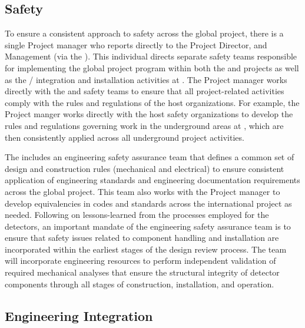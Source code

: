 \subsection{Safety}
\label{sec:dune_safety}

To ensure a consistent approach to safety across the global project,
there is a single Project  manager who reports directly to
the  Project Director,  and 
Management (via the  ).  This individual
directs separate safety teams responsible for implementing the global
project  program within both the  and
 projects as well as the /
integration and installation activities at .  The Project
 manager works directly with the \fnal and  safety
teams to ensure that all project-related activities comply with the
rules and regulations of the host organizations.  For example, the
Project  manger works directly with the host safety
organizations to develop the rules and regulations governing work in
the underground areas at , which are then consistently applied
across all underground project activities.

The  includes an engineering safety assurance team that
defines a common set of design and construction rules (mechanical and
electrical) to ensure consistent application of engineering standards
and engineering documentation requirements across the global project.
This team also works with the Project  manager to develop
equivalencies in codes and standards across the international project
as needed.  Following on lessons-learned from the processes employed
for the  detectors, an important mandate of the
engineering safety assurance team is to ensure that safety issues
related to component handling and installation are incorporated within
the earliest stages of the design review process.  The 
team will incorporate engineering resources to perform independent
validation of required mechanical analyses that ensure the structural
integrity of detector components through all stages of construction,
installation, and operation.

\subsection{Engineering Integration}
\label{sec:dune_engineering}


